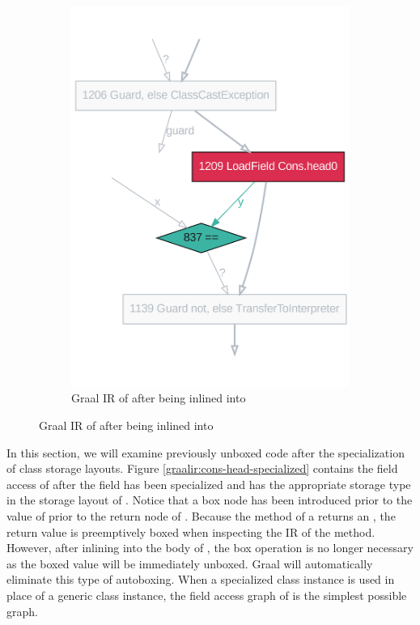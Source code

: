 \begin{figure}[!htb]
\begin{subfigure}[b]{0.4\textwidth}
		\includegraphics[width=\textwidth]{figures/dot/List.contains.specialized.TruffleTier.png}
		\caption{Graal IR of  after being inlined into }
		\label{graalir:cons-contains-head-focus-specialized}
	\end{subfigure}
	\hfill
\end{figure}

In this section, we will examine previously unboxed code after the specialization of class storage layouts.
Figure \ref{graalir:cons-head-specialized} contains the field access of  after the field has been specialized and has the appropriate storage type in the storage layout of .
Notice that a box node has been introduced prior to the value of  prior to the return node of .
Because the  method of a  returns an , the return value is preemptively boxed when inspecting the IR of the method.
However, after inlining into the body of , the box operation is no longer necessary as the boxed value will be immediately unboxed.
Graal will automatically eliminate this type of autoboxing.
When a specialized class instance is used in place of a generic class instance, the field access graph of  is the simplest possible graph.

